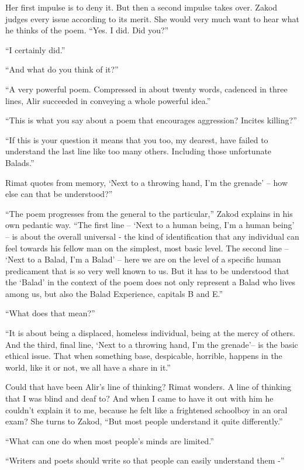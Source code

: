 \documentclass[twoside,11pt]{book}
\begin{document}
Her first impulse is to deny it. But then a second impulse takes over. Zakod judges every issue according to its merit.
She would very much want to hear what he thinks of the poem. ``Yes. I did. Did you?''

``I certainly did.''

``And what do you think of it?''

``A very powerful poem. Compressed in about twenty words, cadenced in three lines, Alir succeeded in
conveying a whole powerful idea.''

``This is what you say about a poem that encourages aggression?  Incites killing?''

``If this is your question it means that you too, my dearest, have failed to understand the last line like
too many others. Including those unfortunate Balads.''

Rimat quotes from memory, `Next to a throwing hand, I'm the grenade' -- how else can that be understood?''

``The poem progresses from the general to the particular,'' Zakod explains in his own pedantic
way. ``The first line -- `Next to a human being, I'm a human being' -- is about the overall universal -
 the kind of identification that any individual can feel towards his fellow man on the simplest, most basic level. The
second line -- `Next to a Balad, I'm a Balad' -- here we are on the level of a specific human predicament that is so
very well known to us. But it has to be understood that the `Balad' in the context of the poem does not only represent
a Balad who lives among us, but also the Balad Experience, capitals B and E.''

``What does that mean?''

``It is about being a displaced, homeless individual, being at the mercy of others. And the third, final
line, `Next to a throwing hand, I'm the  grenade'--  is the basic ethical issue. That when something base, despicable,
horrible, happens in the world, like it or not, we all have a share in
it.''

Could that have been Alir's line of thinking? Rimat wonders. A line of thinking that I was blind and deaf to? And
when I came to have it out with him he couldn't explain it to me, because he felt like a frightened schoolboy in an
oral exam? She turns to Zakod, ``But most people understand it
quite differently.''

``What can one do when most people's minds are limited.''

``Writers and poets should write so that people can easily understand them -''
\end{document}
